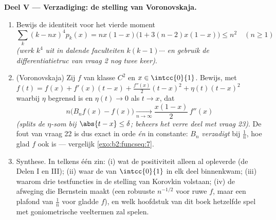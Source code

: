 \begin{problem}
\medskip
\noindent\textbf{Deel V --- Verzadiging: de stelling van
Voronovskaja.}
\begin{enumerate}[resume]
  \item Bewijs de identiteit voor het vierde moment
        \[
        \sum_k (k - nx)^4 p_k(x)
        = nx(1-x)\bigl(1 + 3(n-2)x(1-x)\bigr) \leq n^2
        \quad (n \geq 1)
        \]
        \emph{(werk $k^4$ uit in dalende faculteiten $k(k-1)\cdots$
        en gebruik de differentiatietruc van vraag 2 nog twee
        keer)}.
  \item (Voronovskaja) Zij $f$ van klasse $C^2$ en $x \in
        \intcc{0}{1}$. Bewijs, met $f(t) = f(x) + f'(x)(t-x) +
        \frac{f''(x)}2(t-x)^2 + \eta(t)(t-x)^2$ waarbij $\eta$
        begrensd is en $\eta(t) \to 0$ als $t \to x$, dat
        \[
        n\bigl(B_nf(x) - f(x)\bigr)
        \xrightarrow[n\to\infty]{}
        \frac{x(1-x)}{2}\,f''(x)
        \]
        \emph{(splits de $\eta$-som bij $\abs{t - x} \leq \delta$;
        beheers het verre deel met vraag 23)}. De fout van vraag
        22 is dus exact in orde \emph{én} in constante: $B_n$
        \emph{verzadigt} bij $\frac1n$, hoe glad $f$ ook is ---
        vergelijk \cref{exo:b2:funcseq:7}.
  \item Synthese. In telkens één zin: (i) wat de positiviteit
        alleen al opleverde (de Delen I en III); (ii) waar de
         van $\intcc{0}{1}$ in elk deel binnenkwam;
        (iii) waarom drie testfuncties in de stelling van Korovkin
        volstaan; (iv) de afweging die Bernstein maakt (een robuuste
        $n^{-1/2}$ voor ruwe $f$, maar een plafond van $\frac1n$
        voor gladde $f$), en welk hoofdstuk van dit boek hetzelfde
        spel met goniometrische veeltermen zal spelen.
\end{enumerate}
\end{problem}
